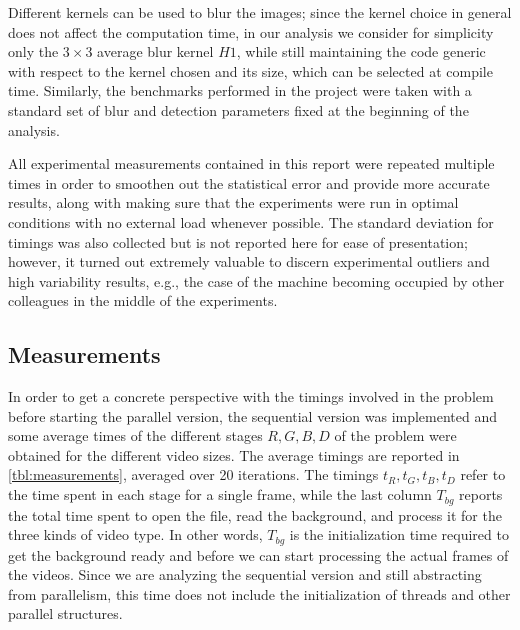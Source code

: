 \documentclass{article}
\begin{document}
Different kernels can be used to blur the images; since the kernel choice in general does not affect the computation time, in our analysis we consider for simplicity only the $3 \times 3$ average blur kernel $H1$, while still maintaining the code generic with respect to the kernel chosen and its size, which can be selected at compile time. Similarly, the benchmarks performed in the project were taken with a standard set of blur and detection parameters fixed at the beginning of the analysis.

All experimental measurements contained in this report were repeated multiple times in order to smoothen out the statistical error and provide more accurate results, along with making sure that the experiments were run in optimal conditions with no external load whenever possible. The standard deviation for timings was also collected but is not reported here for ease of presentation; however, it turned out extremely valuable to discern experimental outliers and high variability results, e.g., the case of the machine becoming occupied by other colleagues in the middle of the experiments.

\subsection{Measurements}\label{sec:measurements}

In order to get a concrete perspective with the timings involved in the problem before starting the parallel version, the sequential version was implemented and some average times of the different stages $R,G,B,D$ of the problem were obtained for the different video sizes. The average timings are reported in \autoref{tbl:measurements}, averaged over 20 iterations. The timings $t_R,t_G,t_B,t_D$ refer to the time spent in each stage for a single frame, while the last column $T_{bg}$ reports the total time spent to open the file, read the background, and process it for the three kinds of video type. In other words, $T_{bg}$ is the initialization time required to get the background ready and before we can start processing the actual frames of the videos. Since we are analyzing the sequential version and still abstracting from parallelism, this time does not include the initialization of threads and other parallel structures.
\end{document}
